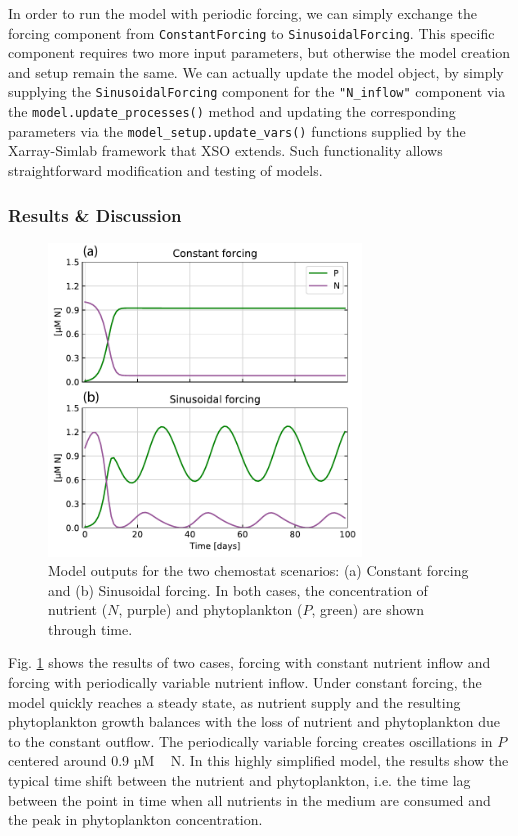 \documentclass[journal abbreviation, manuscript]{copernicus}
\begin{document}
In order to run the model with periodic forcing, we can simply exchange the forcing component from \texttt{ConstantForcing} to \texttt{SinusoidalForcing}. This specific component requires two more input parameters, but otherwise the model creation and setup remain the same. We can actually update the model object, by simply supplying the \texttt{SinusoidalForcing} component for the \texttt{"N\_inflow"} component via the \texttt{model.update\_processes()} method and updating the corresponding parameters via the \texttt{model\_setup.update\_vars()} functions supplied by the Xarray-Simlab framework that XSO extends. Such functionality allows straightforward modification and testing of models.

\subsubsection{Results \& Discussion}

\begin{figure}[t]
\includegraphics[width=8.3cm]{Figures/firstdraft_plots/01_chemostat_output.pdf}
\caption{Model outputs for the two chemostat scenarios: (a) Constant forcing and (b) Sinusoidal forcing. In both cases, the concentration of nutrient ($N$, purple) and phytoplankton ($P$, green) are shown through time.}
\label{Figure:ResultsChemostat}
\end{figure}

Fig. \ref{Figure:ResultsChemostat} shows the results of two cases, forcing with constant nutrient inflow and forcing with periodically variable nutrient inflow. Under constant forcing, the model quickly reaches a steady state, as nutrient supply and the resulting phytoplankton growth balances with the loss of nutrient and phytoplankton due to the constant outflow. The periodically variable forcing creates oscillations in $P$ centered around 0.9 \unit{µM\,N}. In this highly simplified model, the results show the typical time shift between the nutrient and phytoplankton, i.e. the time lag between the point in time when all nutrients in the medium are consumed and the peak in phytoplankton concentration.
\end{document}
